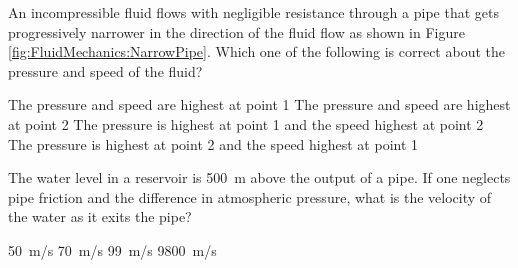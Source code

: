 \question An incompressible fluid flows with negligible resistance through a pipe that gets progressively narrower in the direction of the fluid flow as shown in Figure \ref{fig:FluidMechanics:NarrowPipe}. Which one of the following is correct about the pressure and speed of the fluid?
\begin{choices} 
	\choice The pressure and speed are highest at point 1
	\choice The pressure and speed are highest at point 2
	\CorrectChoice The pressure is highest at point 1 and the speed highest at point 2 \correct
	\choice The pressure is highest at point 2 and the speed highest at point 1
\end{choices}

\question The water level in a reservoir is \SI{500}{m} above the output of a pipe.  If one neglects pipe friction and the difference in atmospheric pressure, what is the velocity of the water as it exits the pipe?
\begin{choices} 
	\choice \SI{50}{m/s}
	\choice \SI{70}{m/s}
	\CorrectChoice \SI{99}{m/s} \correct
	\choice \SI{9800}{m/s}
\end{choices}

%
%
